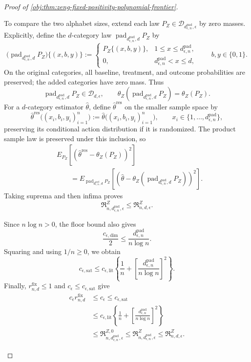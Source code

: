 \begin{proof}[Proof of \cref{obj:thm:zeng-fixed-positivity-polynomial-frontier}]
\begin{enumerate}
To compare the two alphabet sizes, extend each law
\(P_Z\in\mathcal D_{d_{\epsilon,n}^{\mathrm{pad}},\epsilon}\)
by zero masses. Explicitly, define the \(d\)-category law
\(\operatorname{pad}_{d_{\epsilon,n}^{\mathrm{pad}},d}P_Z\) by
\[
\bigl(\operatorname{pad}_{d_{\epsilon,n}^{\mathrm{pad}},d}P_Z\bigr)
\{(x,b,y)\}
:=
\begin{cases}
P_Z\{(x,b,y)\},&1\le x\le d_{\epsilon,n}^{\mathrm{pad}},\\
0,&d_{\epsilon,n}^{\mathrm{pad}}<x\le d,
\end{cases}
\qquad b,y\in\{0,1\}.
\]
On the original categories, all baseline, treatment, and outcome
probabilities are preserved; the added categories have zero mass.
Thus
\[
\operatorname{pad}_{d_{\epsilon,n}^{\mathrm{pad}},d}P_Z
\in\mathcal D_{d,\epsilon},
\qquad
\theta_Z\!\left(
\operatorname{pad}_{d_{\epsilon,n}^{\mathrm{pad}},d}P_Z
\right)
=\theta_Z(P_Z).
\]
For a \(d\)-category estimator \(\widehat\theta\), define
\(\widehat\theta^{\mathrm{res}}\) on the smaller sample space by
\[
\widehat\theta^{\mathrm{res}}
\bigl((x_i,b_i,y_i)_{i=1}^n\bigr)
:=
\widehat\theta
\bigl((x_i,b_i,y_i)_{i=1}^n\bigr),
\qquad
x_i\in\{1,\ldots,d_{\epsilon,n}^{\mathrm{pad}}\},
\]
preserving its conditional action distribution if it is randomized.
The product sample law is preserved under this inclusion, so
\[
\begin{split}
&E_{P_Z}\!\left[
\left(\widehat\theta^{\mathrm{res}}-\theta_Z(P_Z)\right)^2
\right]\\
&\qquad=
E_{\operatorname{pad}_{d_{\epsilon,n}^{\mathrm{pad}},d}P_Z}
\!\left[
\left(
\widehat\theta-
\theta_Z\!\left(
\operatorname{pad}_{d_{\epsilon,n}^{\mathrm{pad}},d}P_Z
\right)
\right)^2
\right].
\end{split}
\]
Taking suprema and then infima proves
\[
\mathfrak R^Z_{n,d_{\epsilon,n}^{\mathrm{pad}},\epsilon}
\le
\mathfrak R^Z_{n,d,\epsilon}.
\]

Since \(n\log n>0\), the floor bound also gives
\[
\frac{c_{\epsilon,\mathrm{dim}}}{2}
\le
\frac{d_{\epsilon,n}^{\mathrm{pad}}}{n\log n}.
\]
Squaring and using \(1/n\ge0\), we obtain
\[
c_{\epsilon,\mathrm{sat}}
\le
c_{\epsilon,\mathrm{lit}}
\left\{
\frac1n+
\left[
\frac{d_{\epsilon,n}^{\mathrm{pad}}}{n\log n}
\right]^2
\right\}.
\]
Finally, \(r^{\mathrm{fix}}_{n,d}\le1\) and
\(c_\epsilon\le c_{\epsilon,\mathrm{sat}}\) give
\[
\begin{split}
c_\epsilon r^{\mathrm{fix}}_{n,d}
&\le c_\epsilon
\le c_{\epsilon,\mathrm{sat}}\\
&\le
c_{\epsilon,\mathrm{lit}}
\left\{
\frac1n+
\left[
\frac{d_{\epsilon,n}^{\mathrm{pad}}}{n\log n}
\right]^2
\right\}\\
&\le
\mathfrak R^{Z,0}_{n,d_{\epsilon,n}^{\mathrm{pad}},\epsilon}
\le
\mathfrak R^Z_{n,d_{\epsilon,n}^{\mathrm{pad}},\epsilon}
\le
\mathfrak R^Z_{n,d,\epsilon}.
\end{split}
\]


\end{enumerate}
\end{proof}
